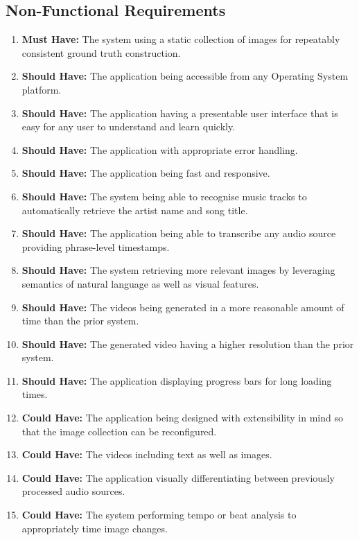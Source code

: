 \documentclass{l4proj}
\begin{document}
\subsection{Non-Functional Requirements}
\begin{enumerate}[resume]
    \item \label{req:18} \textbf{Must Have:} The system using a static collection of images for repeatably consistent ground truth construction.
    \item \label{req:19} \textbf{Should Have:} The application being accessible from any Operating System platform.
    \item \label{req:20} \textbf{Should Have:} The application having a presentable user interface that is easy for any user to understand and learn quickly.
    \item \label{req:21} \textbf{Should Have:} The application with appropriate error handling.
    \item \label{req:22} \textbf{Should Have:} The application being fast and responsive.
    \item \label{req:23} \textbf{Should Have:} The system being able to recognise music tracks to automatically retrieve the artist name and song title.
    \item \label{req:24} \textbf{Should Have:} The application being able to transcribe any audio source providing phrase-level timestamps.
    \item \label{req:25} \textbf{Should Have:} The system retrieving more relevant images by leveraging semantics of natural language as well as visual features.
    \item \label{req:26} \textbf{Should Have:} The videos being generated in a more reasonable amount of time than the prior system.
    \item \label{req:27} \textbf{Should Have:} The generated video having a higher resolution than the prior system.
    \item \label{req:28} \textbf{Should Have:} The application displaying progress bars for long loading times.
    \item \label{req:29} \textbf{Could Have:} The application being designed with extensibility in mind so that the image collection can be reconfigured.
    \item \label{req:30} \textbf{Could Have:} The videos including text as well as images.
    \item \label{req:31} \textbf{Could Have:} The application visually differentiating between previously processed audio sources.
    \item \label{req:32} \textbf{Could Have:} The system performing tempo or beat analysis to appropriately time image changes.
\end{enumerate}
\end{document}
